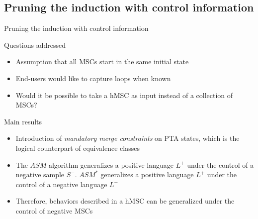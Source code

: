 \documentclass[11pt]{beamer}
\begin{document}
\subsection{Pruning the induction with control information}
\begin{frame}{Pruning the induction with control information}
	\begin{block}{Questions addressed}
		\begin{itemize}
			\item Assumption that all MSCs start in the same initial state
			\item End-users would like to capture loops when known
			\item Would it be possible to take a hMSC as input instead of a collection of MSCs?
		\end{itemize}
	\end{block}
	\begin{block}{Main results}
		\begin{itemize}
			\item Introduction of \emph{mandatory merge constraints} on PTA states, which is the logical counterpart
				of equivalence classes
			\item The $ASM$ algorithm generalizes a positive language $L^+$ under the control of a negative sample $S^-$. 
			          $ASM^*$ generalizes a positive language $L^+$ under the control of a negative language $L^-$
			\item Therefore, behaviors described in a hMSC can be generalized under the control of negative MSCs 
		\end{itemize}
	\end{block}
\end{frame}
\end{document}
